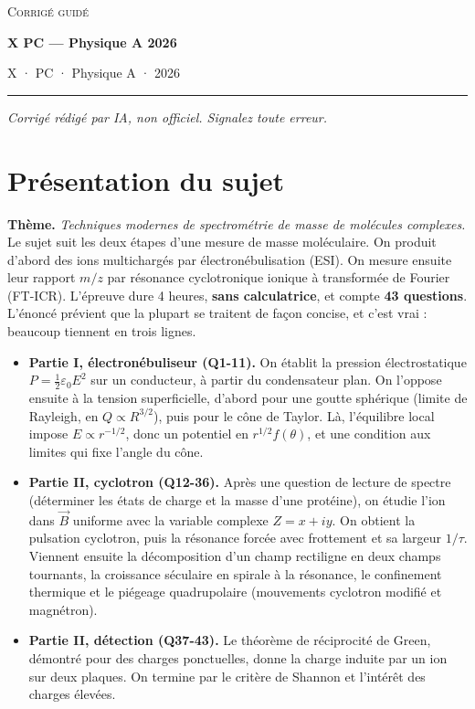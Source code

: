 \documentclass[11pt,a4paper]{article}
\providecommand{\tightlist}{\setlength{\itemsep}{0pt}\setlength{\parskip}{0pt}}
\begin{document}
\thispagestyle{plain}
\begin{center}
  {\small\scshape Corrigé guidé}\par\smallskip
  {\LARGE\bfseries X PC — Physique A 2026\par}\medskip
  {\large X · PC · Physique A · 2026\par}
\end{center}
\vspace{2pt}\hrule\vspace{8pt}

\emph{Corrigé rédigé par IA, non officiel. Signalez toute erreur.}

\hypertarget{pruxe9sentation-du-sujet}{%
\section{Présentation du sujet}\label{pruxe9sentation-du-sujet}}

\textbf{Thème.} \emph{Techniques modernes de spectrométrie de masse de molécules complexes.} Le sujet suit les deux étapes d'une mesure de masse moléculaire. On produit d'abord des ions multichargés par électronébulisation (ESI). On mesure ensuite leur rapport \(m/z\) par résonance cyclotronique ionique à transformée de Fourier (FT-ICR). L'épreuve dure 4 heures, \textbf{sans calculatrice}, et compte \textbf{43 questions}. L'énoncé prévient que la plupart se traitent de façon concise, et c'est vrai : beaucoup tiennent en trois lignes.

\begin{itemize}
\tightlist
\item
  \textbf{Partie I, électronébuliseur (Q1-11).} On établit la pression électrostatique \(P=\frac12\varepsilon_0E^2\) sur un conducteur, à partir du condensateur plan. On l'oppose ensuite à la tension superficielle, d'abord pour une goutte sphérique (limite de Rayleigh, en \(Q\propto R^{3/2}\)), puis pour le cône de Taylor. Là, l'équilibre local impose \(E\propto r^{-1/2}\), donc un potentiel en \(r^{1/2}f(\theta)\), et une condition aux limites qui fixe l'angle du cône.
\item
  \textbf{Partie II, cyclotron (Q12-36).} Après une question de lecture de spectre (déterminer les états de charge et la masse d'une protéine), on étudie l'ion dans \(\vec B\) uniforme avec la variable complexe \(Z=x+iy\). On obtient la pulsation cyclotron, puis la résonance forcée avec frottement et sa largeur \(1/\tau\). Viennent ensuite la décomposition d'un champ rectiligne en deux champs tournants, la croissance séculaire en spirale à la résonance, le confinement thermique et le piégeage quadrupolaire (mouvements cyclotron modifié et magnétron).
\item
  \textbf{Partie II, détection (Q37-43).} Le théorème de réciprocité de Green, démontré pour des charges ponctuelles, donne la charge induite par un ion sur deux plaques. On termine par le critère de Shannon et l'intérêt des charges élevées.
\end{itemize}
\end{document}

